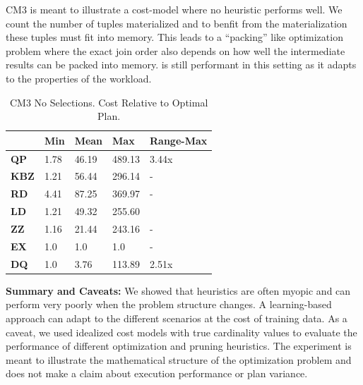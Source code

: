 CM3 is meant to illustrate a cost-model where no heuristic performs well. We count the number of tuples materialized and to benfit from the materialization these tuples must fit into memory. This leads to a ``packing'' like optimization problem where the exact join order also depends on how well the intermediate results can be packed into memory. \sys is still performant in this setting as it adapts to the properties of the workload.

\begin{table}[ht!]\centering \small
\caption{CM3 No Selections. Cost Relative to Optimal Plan. }\vspace{0.25em}
\begin{tabular}{|l|l|l|l|l|}
\hline
    & {\bf Min}  & {\bf Mean}  & {\bf Max}    & {\bf Range-Max} \\ \hline
{\bf QP}  & 1.78  & 46.19 & 489.13 & 3.44x      \\ \hline
{\bf KBZ} & 1.21  & 56.44  & 296.14  & -         \\ \hline
{\bf RD}  & 4.41 & 87.25 & 369.97 & -         \\ \hline
{\bf LD}  & 1.21  & 49.32   & 255.60    &           \\ \hline
{\bf ZZ}  & 1.16  & 21.44   & 243.16    & -         \\ \hline
{\bf EX}  & 1.0  & 1.0   & 1.0    & -         \\ \hline
\hline
{\bf DQ}  & 1.0  & 3.76   & 113.89    & 2.51x\\ \hline
\end{tabular}
\end{table}

\vspace{0.5em}\noindent \textbf{Summary and Caveats: }  We showed that heuristics are often myopic and can perform very poorly when the problem structure changes. A learning-based approach can adapt to the different scenarios at the cost of training data. As a caveat, we used idealized cost models with true cardinality values to evaluate the performance of different optimization and pruning heuristics. The experiment is meant to illustrate the mathematical structure of the optimization problem and does not make a claim about execution performance or plan variance.

